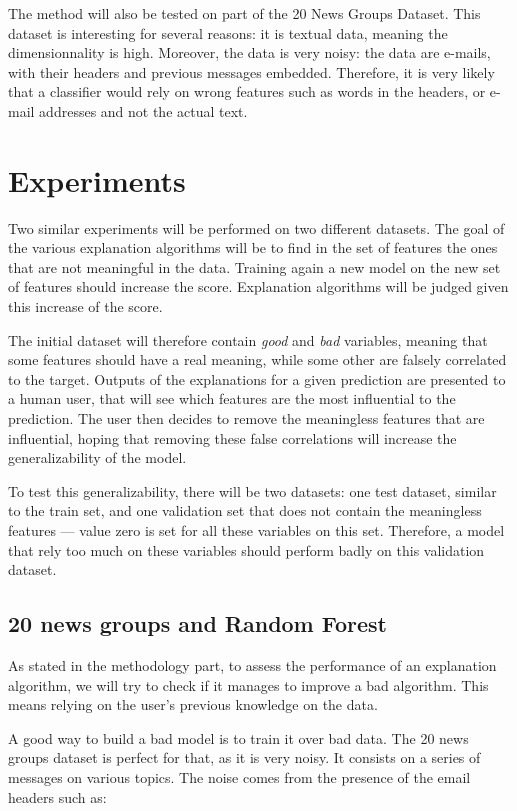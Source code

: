 \documentclass[a4paper,11pt]{kth-mag}
\begin{document}
The method will also be tested on part of the 20 News Groups Dataset. This dataset is interesting for several reasons: it is textual data, meaning the dimensionnality is high. Moreover, the data is very noisy: the data are e-mails, with their headers and previous messages embedded. Therefore, it is very likely that a classifier would rely on wrong features such as words in the headers, or e-mail addresses and not the actual text.


\chapter{Experiments}

Two similar experiments will be performed on two different datasets. The goal of the various explanation algorithms will be to find in the set of features the ones that are not meaningful in the data. Training again a new model on the new set of features should increase the score. Explanation algorithms will be judged given this increase of the score.

The initial dataset will therefore contain \textit{good} and \textit{bad} variables, meaning that some features should have a real meaning, while some other are falsely correlated to the target. Outputs of the explanations for a given prediction are presented to a human user, that will see which features are the most influential to the prediction. The user then decides to remove the meaningless features that are influential, hoping that removing these false correlations will increase the generalizability of the model.

To test this generalizability, there will be two datasets: one test dataset, similar to the train set, and one validation set that does not contain the meaningless features --- value zero is set for all these variables on this set. Therefore, a model that rely too much on these variables should perform badly on this validation dataset.

\section{20 news groups and Random Forest}

As stated in the methodology part, to assess the performance of an explanation algorithm, we will try to check if it manages to improve a bad algorithm. This means relying on the user's previous knowledge on the data.

A good way to build a bad model is to train it over bad data. The 20 news groups dataset is perfect for that, as it is very noisy. It consists on a series of messages on various topics. The noise comes from the presence of the email headers such as:
\end{document}
